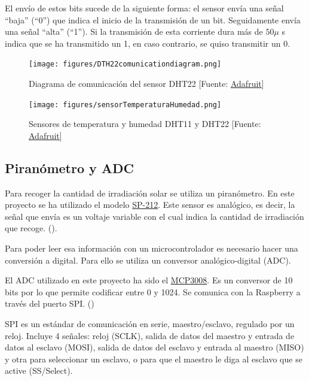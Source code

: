 El envío de estos bits sucede de la siguiente forma: el sensor envía una señal ``baja'' (``0'') que indica el inicio de la transmisión de un bit. Seguidamente envía una señal ``alta'' (``1''). Si la transmisión de esta corriente dura más de $ 50 \mu $ s indica que se ha transmitido un 1, en caso contrario, se quiso transmitir un 0.

\begin{figure}[htb]
	\begin{center}
		\texttt{[image: figures/DTH22comunicationdiagram.png]}
		\caption{Diagrama de comunicación del sensor DHT22 [Fuente: \href{https://cdn-shop.adafruit.com/datasheets/Digital+humidity+and+temperature+sensor+AM2302.pdf}{Adafruit}] \label{DHT22comunication}}
	\end{center}
\end{figure} 

 \begin{figure}[htb]
	\begin{center}
		\texttt{[image: figures/sensorTemperaturaHumedad.png]}
		\caption{Sensores de temperatura y humedad DHT11 y DHT22 [Fuente: \href{https://cdn-shop.adafruit.com/datasheets/Digital+humidity+and+temperature+sensor+AM2302.pdf}{Adafruit}] \label{sensor}}
	\end{center}
\end{figure} 

\subsection{Piranómetro y ADC}
\label{makereference3.2.3}
Para recoger la cantidad de irradiación solar se utiliza un piranómetro. En este proyecto se ha utilizado el modelo \href{https://www.apogeeinstruments.co.uk/content/SP-212-215-manual.pdf}{SP-212}. Este sensor es analógico, es decir, la señal que envía es un voltaje variable con el cual indica la cantidad de irradiación que recoge. (\cite{ARP:Apogee:2017}).

Para poder leer esa información con un microcontrolador es necesario hacer una conversión a digital. Para ello se utiliza un conversor analógico-digital (ADC).

El ADC utilizado en este proyecto ha sido el \href{https://cdn-shop.adafruit.com/datasheets/MCP3008.pdf}{MCP3008}. Es un conversor de 10 bits por lo que permite codificar entre 0 y 1024. Se comunica con la Raspberry a través del puerto SPI. (\cite{ARP:Adafruit:2017})

SPI es un estándar de comunicación en serie, maestro/esclavo, regulado por un reloj. Incluye 4 señales: reloj (SCLK), salida de datos del maestro y entrada de datos al esclavo (MOSI), salida de datos del esclavo y entrada al maestro (MISO) y otra para seleccionar un esclavo, o para que el maestro le diga al esclavo que se active (SS/Select).

